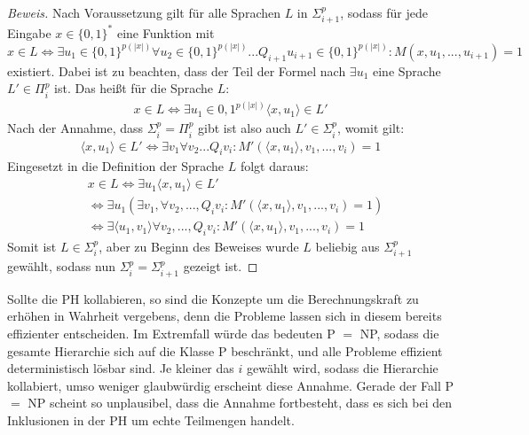 \begin{proof}[Beweis] \cite{rothe_komplexitatstheorie_2008}
    Nach Voraussetzung gilt für alle Sprachen $L$ in $\Sigma^p_{i+1}$, sodass für jede Eingabe $x \in \{0,1\}^*$ eine Funktion mit 
    $$
    x \in L \Leftrightarrow \exists u_1 \in \{0,1\}^{p(|x|)} \forall u_2 \in \{0,1\}^{p(|x|)} ... Q_{i+1}u_{i + 1} \in \{0,1\}^{p(|x|)} : M(x, u_1, ..., u_{i+1}) = 1
    $$
    existiert.
    Dabei ist zu beachten, dass der Teil der Formel nach $\exists u_1$ eine Sprache $L' \in \Pi^p_i$ ist.
    Das heißt für die Sprache $L$:
    \begin{align*}
    x \in L \Leftrightarrow \exists u_1 \in {0,1}^{p(|x|)} \langle x, u_1 \rangle \in L'
    \end{align*}
    Nach der Annahme, dass  $\Sigma^p_i = \Pi^p_i$ gibt ist also auch $L' \in \Sigma^p_i$, womit gilt:
    \begin{align*}
    \langle x, u_1 \rangle \in L' \Leftrightarrow \exists v_1 \forall v_2 ... Q_i v_i : M'(\langle x, u_1 \rangle, v_1, ..., v_i) = 1 
    \end{align*}
    Eingesetzt in die Definition der Sprache $L$ folgt daraus:
    \begin{align*}
    & x \in L \Leftrightarrow \exists u_1 \langle x, u_1 \rangle \in L' \\
    & \Leftrightarrow \exists u_1 (\exists v_1, \forall v_2, ..., Q_i v_i :  M'(\langle x, u_1 \rangle, v_1, ..., v_i) = 1) \\
    & \Leftrightarrow \exists \langle u_1, v_1 \rangle \forall v_2, ..., Q_i v_i : M'(\langle x, u_1 \rangle, v_1, ..., v_i) = 1
    \end{align*}
    Somit ist $L \in \Sigma^p_i$, aber zu Beginn des Beweises wurde $L$ beliebig aus $\Sigma^p_{i+1}$ gewählt, sodass nun $\Sigma^p_i = \Sigma^p_{i+1}$ gezeigt ist.
\end{proof}


Sollte die PH kollabieren, so sind die Konzepte um die Berechnungskraft zu erhöhen in Wahrheit vergebens, denn die Probleme lassen sich in diesem bereits effizienter entscheiden.
Im Extremfall würde das bedeuten P $=$ NP, sodass die gesamte Hierarchie sich auf die Klasse P beschränkt, und alle Probleme effizient deterministisch lösbar sind.
Je kleiner das $i$ gewählt wird, sodass die Hierarchie kollabiert, umso weniger glaubwürdig erscheint diese Annahme.
Gerade der Fall P $=$ NP scheint so unplausibel, dass die Annahme fortbesteht, dass es sich bei den Inklusionen in der PH um echte Teilmengen handelt.
